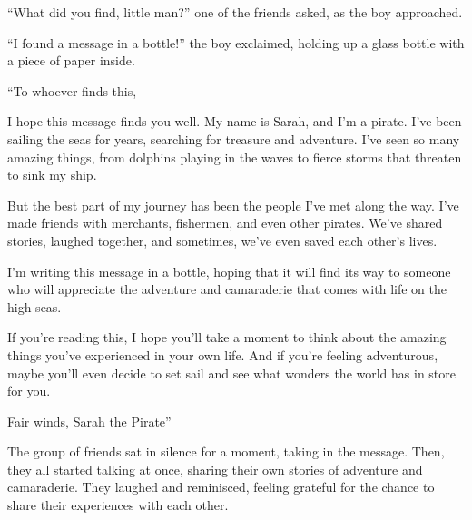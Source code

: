 \documentclass[a4paper]{article}
\begin{document}
\hspace{10pt} ``What did you find, little man?'' one of the friends asked, as the boy approached.
\vspace{1ex}

\hspace{10pt} ``I found a message in a bottle!'' the boy exclaimed, holding up a glass bottle with a piece of paper inside.
\vspace{1ex}

\hspace{10pt} ``To whoever finds this, 
\vspace{1ex}

\hspace{10pt} I hope this message finds you well. My name is Sarah, and I'm a pirate. I've been sailing the seas for years, searching for treasure and adventure. I've seen so many amazing things, from dolphins playing in the waves to fierce storms that threaten to sink my ship.
\vspace{1ex}

\hspace{10pt} But the best part of my journey has been the people I've met along the way. I've made friends with merchants, fishermen, and even other pirates. We've shared stories, laughed together, and sometimes, we've even saved each other's lives.
\vspace{1ex}

\hspace{10pt} I'm writing this message in a bottle, hoping that it will find its way to someone who will appreciate the adventure and camaraderie that comes with life on the high seas.
\vspace{1ex}

\hspace{10pt} If you're reading this, I hope you'll take a moment to think about the amazing things you've experienced in your own life. And if you're feeling adventurous, maybe you'll even decide to set sail and see what wonders the world has in store for you.
\vspace{1ex}

\hspace{10pt} Fair winds, Sarah the Pirate''
\vspace{1ex}

\hspace{10pt} The group of friends sat in silence for a moment, taking in the message. Then, they all started talking at once, sharing their own stories of adventure and camaraderie. They laughed and reminisced, feeling grateful for the chance to share their experiences with each other.
\vspace{1ex}
\end{document}

